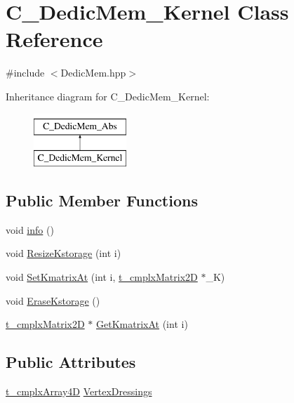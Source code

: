 \hypertarget{class_c___dedic_mem___kernel}{\section{C\-\_\-\-Dedic\-Mem\-\_\-\-Kernel Class Reference}
\label{class_c___dedic_mem___kernel}
}


{\ttfamily \#include $<$Dedic\-Mem.\-hpp$>$}

Inheritance diagram for C\-\_\-\-Dedic\-Mem\-\_\-\-Kernel\-:\begin{figure}[H]
\begin{center}
\leavevmode
\includegraphics[height=2.000000cm]{class_c___dedic_mem___kernel}
\end{center}
\end{figure}
\subsection*{Public Member Functions}
\begin{DoxyCompactItemize}
\item 
void \hyperlink{class_c___dedic_mem___kernel_aa51b1668792ba7e0f843b2d03deb5819}{info} ()
\item 
void \hyperlink{class_c___dedic_mem___kernel_a53112d51dde01d8b4bd8f48ccce36a91}{Resize\-Kstorage} (int i)
\item 
void \hyperlink{class_c___dedic_mem___kernel_ac2013ecffb5dab674a568ef256f5a3f8}{Set\-Kmatrix\-At} (int i, \hyperlink{types_8h_ab0ebabce2061a9cbb83363a282add98f}{t\-\_\-cmplx\-Matrix2\-D} $\ast$\-\_\-\-K)
\item 
void \hyperlink{class_c___dedic_mem___kernel_ae8436015627826c00ef38c038ef829f8}{Erase\-Kstorage} ()
\item 
\hyperlink{types_8h_ab0ebabce2061a9cbb83363a282add98f}{t\-\_\-cmplx\-Matrix2\-D} $\ast$ \hyperlink{class_c___dedic_mem___kernel_aa95a927579efd2c095634e813c0db40f}{Get\-Kmatrix\-At} (int i)
\end{DoxyCompactItemize}
\subsection*{Public Attributes}
\begin{DoxyCompactItemize}
\item 
\hyperlink{types_8h_a71e866ee00a3173697327849014bce9b}{t\-\_\-cmplx\-Array4\-D} \hyperlink{class_c___dedic_mem___kernel_a1b2fcfb12ebf53baed1105d05c61f5fb}{Vertex\-Dressings}
\end{DoxyCompactItemize}


